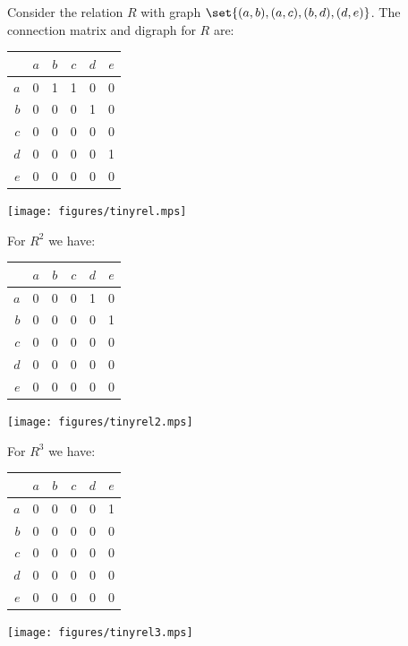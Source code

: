 \begin{example}
\begin{samepage}
Consider the relation $R$ with graph $\set{(a,b), (a,c), (b,d), (d,e)}$.
The connection matrix and digraph for $R$ are:
    \begin{center}
      \begin{tabular}[b]{r|ccccc}
            &$a$&$b$&$c$&$d$&$e$ \\
        \hline
        $a$ & 0 & 1 & 1 & 0 & 0  \\
        $b$ & 0 & 0 & 0 & 1 & 0  \\
        $c$ & 0 & 0 & 0 & 0 & 0  \\
        $d$ & 0 & 0 & 0 & 0 & 1  \\
        $e$ & 0 & 0 & 0 & 0 & 0
      \end{tabular}
      \hfil
      \texttt{[image: figures/tinyrel.mps]}
    \end{center}    
  \end{samepage}
  \begin{samepage}
   For $R^2$ we have:
    \begin{center}
      \begin{tabular}[b]{r|ccccc}
            &$a$&$b$&$c$&$d$&$e$ \\
        \hline
        $a$ & 0 & 0 & 0 & 1 & 0  \\
        $b$ & 0 & 0 & 0 & 0 & 1  \\
        $c$ & 0 & 0 & 0 & 0 & 0  \\
        $d$ & 0 & 0 & 0 & 0 & 0  \\
        $e$ & 0 & 0 & 0 & 0 & 0
      \end{tabular}
      \hfil
      \texttt{[image: figures/tinyrel2.mps]}
    \end{center}
  \end{samepage}
  \begin{samepage}
   For $R^3$ we have:
    \begin{center}
      \begin{tabular}[b]{r|ccccc}
            &$a$&$b$&$c$&$d$&$e$ \\
        \hline
        $a$ & 0 & 0 & 0 & 0 & 1  \\
        $b$ & 0 & 0 & 0 & 0 & 0  \\
        $c$ & 0 & 0 & 0 & 0 & 0  \\
        $d$ & 0 & 0 & 0 & 0 & 0  \\
        $e$ & 0 & 0 & 0 & 0 & 0
      \end{tabular}
      \hfil
      \texttt{[image: figures/tinyrel3.mps]}
    \end{center}
  \end{samepage}
\end{example}


